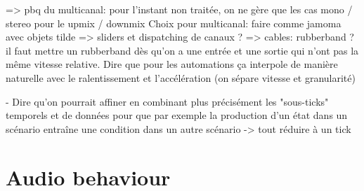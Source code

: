 \documentclass[applsci,article,submit,moreauthors,pdftex,10pt,a4paper]{mdpi}
\begin{document}
=> pbq du multicanal: pour l'instant non traitée, on ne gère que les cas mono / stereo pour le upmix / downmix
Choix pour multicanal: faire comme jamoma avec objets tilde
=> sliders et dispatching de canaux ?
=> cables: rubberband ? il faut mettre un rubberband dès qu'on a une entrée et une sortie qui n'ont pas la même vitesse relative. Dire que pour les automations ça interpole de manière naturelle avec le ralentissement et l'accélération (on sépare vitesse et granularité)


- Dire qu'on pourrait affiner en combinant plus précisément les "sous-ticks" temporels et de données
pour que par exemple la production d'un état dans un scénario entraîne une condition dans un autre scénario -> tout réduire à un tick


\section{Audio behaviour}
\end{document}
